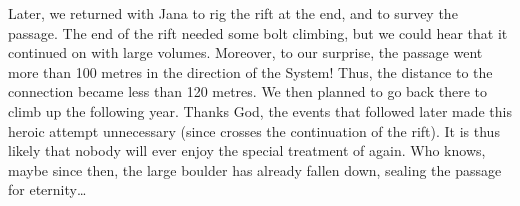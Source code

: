
Later, we returned with Jana to rig the rift at the end, and to survey
the passage. The end of the rift needed some bolt climbing, but we could
hear that it continued on with large volumes. Moreover, to our surprise,
the passage went more than 100 metres in the direction of the System!
Thus, the distance to the connection became less than 120 metres. We
then planned to go back there to climb up the following year. Thanks
God, the events that followed later made this heroic attempt unnecessary
(since 
crosses the continuation of the rift). It is thus likely that nobody
will ever enjoy the special treatment of  again. Who
knows, maybe since then, the large boulder has already fallen down,
sealing the passage for eternity\ldots{}

